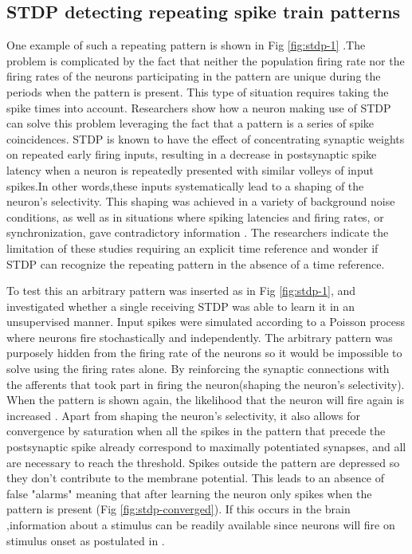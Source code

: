 \documentclass[12pt]{report}
\begin{document}
\subsection{STDP detecting repeating spike train patterns}
One example of such a repeating pattern is shown in Fig \ref{fig:stdp-1} .The problem is complicated by the fact that neither the population firing rate nor the firing rates of the neurons participating in the pattern are unique during the periods when the pattern is present. This type of situation requires taking the spike times into account. Researchers show how a neuron making use of STDP can solve this problem leveraging the fact that a pattern is a series of spike coincidences. STDP is known to have the effect of concentrating synaptic weights on repeated early firing inputs, resulting in a decrease in postsynaptic spike latency when a neuron is repeatedly presented with similar volleys of input spikes.In other words,these inputs systematically lead to a shaping of the neuron's selectivity. This shaping was achieved in a variety of background noise conditions, as well as in situations where spiking latencies and firing rates, or synchronization, gave contradictory information \cite{rossum2000} \cite{guyonneau2005} \cite{masquelier2007} . The researchers indicate the limitation of these studies requiring an explicit time reference and wonder if STDP can recognize the repeating pattern in the absence of a time reference.

To test this an arbitrary pattern was inserted as in Fig \ref{fig:stdp-1}, and investigated whether a single receiving STDP was able to learn it in an unsupervised manner. Input spikes were simulated according to a Poisson process where neurons fire stochastically and independently. The arbitrary pattern was purposely hidden from the firing rate of the neurons so it would be impossible to solve using the firing rates alone. By reinforcing the synaptic connections with the afferents that took part in firing the neuron(shaping the neuron's selectivity). When the pattern is shown again, the likelihood that the neuron will fire again is increased . Apart from shaping the neuron's selectivity, it also allows for convergence by saturation when all the spikes in the pattern that precede the postsynaptic spike already correspond to maximally potentiated synapses, and all are necessary to reach the threshold. Spikes outside the pattern are depressed so they don't contribute to the membrane potential. This leads to an absence of false "alarms" meaning that after learning the neuron only spikes when the pattern is present (Fig \ref{fig:stdp-converged}). If this occurs in the brain ,information about a stimulus can be readily available since neurons will fire on stimulus onset as postulated in \cite{thorpe2001}. 
\end{document}
